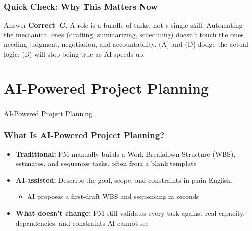 \begin{frame}[fragile]\frametitle{Quick Check: Why This Matters Now}
\begin{block}{Answer}
\textbf{Correct: C.} A role is a bundle of tasks, not a single skill. Automating the mechanical ones (drafting, summarizing, scheduling) doesn't touch the ones needing judgment, negotiation, and accountability. (A) and (D) dodge the actual logic; (B) will stop being true as AI speeds up.
\end{block}
\end{frame}

\section[Plan]{AI-Powered Project Planning}
\begin{frame}[fragile]\frametitle{}
\begin{center}
{\Large AI-Powered Project Planning}
\end{center}
\end{frame}

\begin{frame}[fragile]\frametitle{What Is AI-Powered Project Planning?}

\begin{itemize}
  \item \textbf{Traditional:} PM manually builds a Work Breakdown Structure (WBS), estimates, and sequences tasks, often from a blank template
  \item \textbf{AI-assisted:} Describe the goal, scope, and constraints in plain English.
    \begin{itemize}
      \item AI proposes a first-draft WBS and sequencing in seconds
    \end{itemize}
  \item \textbf{What doesn't change:} PM still validates every task against real capacity, dependencies, and constraints AI cannot see
\end{itemize}

\end{frame}

